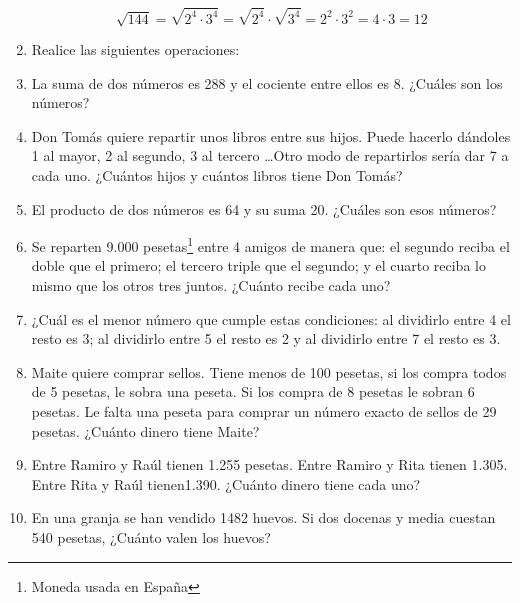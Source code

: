 \documentclass[twoside]{article}
\begin{document}
\begin{enumerate}
\[\sqrt{144}=\sqrt{2^{4}\cdot 3^{4}}=\sqrt{2^{4}}\cdot \sqrt{3^{4}}=2^{2}\cdot 3^{2}=4\cdot 3=12\]
\begin{enumerate}
\end{enumerate}
\item Realice las siguientes operaciones:
\begin{enumerate}
\end{enumerate}
\item La suma de dos números es 288 y el cociente entre ellos es 8. ¿Cuáles son los números?
\item Don Tomás quiere repartir unos libros entre sus hijos. Puede hacerlo dándoles 1 al mayor, 2 al segundo, 3 al tercero \ldots Otro modo de repartirlos sería dar 7 a cada uno. ¿Cuántos hijos y cuántos libros tiene Don Tomás?
\item El producto de dos números es 64 y su suma 20. ¿Cuáles son esos números?
\item Se reparten 9.000 pesetas\footnote{Moneda usada en España} entre 4 amigos de manera que: el segundo reciba el doble que el primero; el tercero triple que el segundo; y el cuarto reciba lo mismo que los otros tres juntos. ¿Cuánto recibe cada uno?
\item ¿Cuál es el menor número que cumple estas condiciones: al dividirlo entre 4 el resto es 3; al dividirlo entre 5 el resto es 2 y al dividirlo entre 7 el resto es 3.
\item Maite quiere comprar sellos. Tiene menos de 100 pesetas, si los compra todos de 5 pesetas, le sobra una peseta. Si los compra de 8 pesetas le sobran 6 pesetas. Le falta una peseta para comprar un número exacto de sellos de 29 pesetas. ¿Cuánto dinero tiene Maite?
\item Entre Ramiro y Raúl tienen 1.255 pesetas. Entre Ramiro y Rita tienen 1.305. Entre Rita y Raúl tienen1.390. ¿Cuánto dinero tiene cada uno?
\item En una granja se han vendido 1482 huevos. Si dos docenas y media cuestan 540 pesetas, ¿Cuánto valen los huevos?

\end{enumerate}
\end{document}
